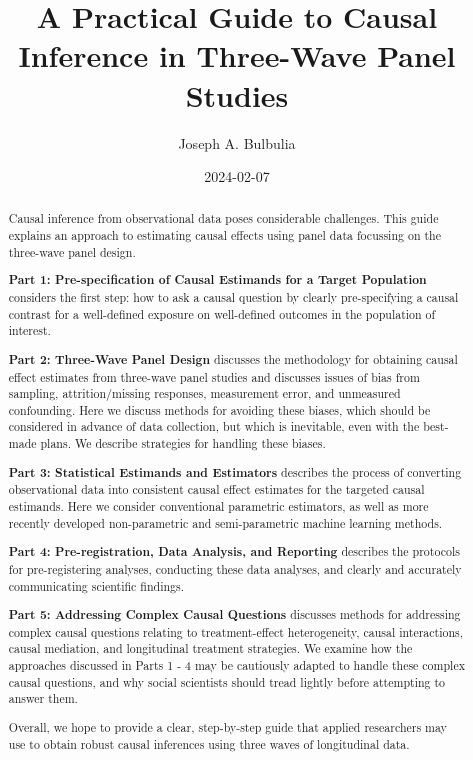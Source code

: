 \documentclass[
  singlecolumn]{article}
\title{A Practical Guide to Causal Inference in Three-Wave Panel
Studies}
\author{Joseph A. Bulbulia}
\date{2024-02-07}
\begin{document}
\maketitle
\begin{abstract}
Causal inference from observational data poses considerable challenges.
This guide explains an approach to estimating causal effects using panel
data focussing on the three-wave panel design.

\textbf{Part 1: Pre-specification of Causal Estimands for a Target
Population} considers the first step: how to ask a causal question by
clearly pre-specifying a causal contrast for a well-defined exposure on
well-defined outcomes in the population of interest.

\textbf{Part 2: Three-Wave Panel Design} discusses the methodology for
obtaining causal effect estimates from three-wave panel studies and
discusses issues of bias from sampling, attrition/missing responses,
measurement error, and unmeasured confounding. Here we discuss methods
for avoiding these biases, which should be considered in advance of data
collection, but which is inevitable, even with the best-made plans. We
describe strategies for handling these biases.

\textbf{Part 3: Statistical Estimands and Estimators} describes the
process of converting observational data into consistent causal effect
estimates for the targeted causal estimands. Here we consider
conventional parametric estimators, as well as more recently developed
non-parametric and semi-parametric machine learning methods.

\textbf{Part 4: Pre-registration, Data Analysis, and Reporting}
describes the protocols for pre-registering analyses, conducting these
data analyses, and clearly and accurately communicating scientific
findings.

\textbf{Part 5: Addressing Complex Causal Questions} discusses methods
for addressing complex causal questions relating to treatment-effect
heterogeneity, causal interactions, causal mediation, and longitudinal
treatment strategies. We examine how the approaches discussed in Parts 1
- 4 may be cautiously adapted to handle these complex causal questions,
and why social scientists should tread lightly before attempting to
answer them.

Overall, we hope to provide a clear, step-by-step guide that applied
researchers may use to obtain robust causal inferences using three waves
of longitudinal data.
\end{abstract}
\end{document}
